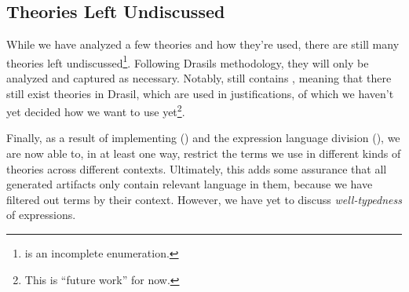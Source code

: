 \subsection{Theories Left Undiscussed}
\label{chap:more-theory-kinds:sec:classify-all-the-theories:subsec:theories-left-undiscussed}

While we have analyzed a few theories and how they're used, there are still many
theories left undiscussed\footnote{\ModelKinds{} is an incomplete enumeration.}.
Following Drasils methodology, they will only be analyzed and captured as
necessary. Notably, \ModelKinds{} still contains \OthModel{}, meaning that there
still exist theories in Drasil, which are used in justifications, of which we
haven't yet decided how we want to use yet\footnote{This is ``future work'' for
now.}.

Finally, as a result of implementing \ModelKinds{} () and
the expression language division (), we are now able
to, in at least one way, restrict the terms we use in different kinds of
theories across different contexts. Ultimately, this adds some assurance that
all generated artifacts only contain relevant language in them, because we have
filtered out terms by their context. However, we have yet to discuss
\textit{well-typedness} of expressions.
